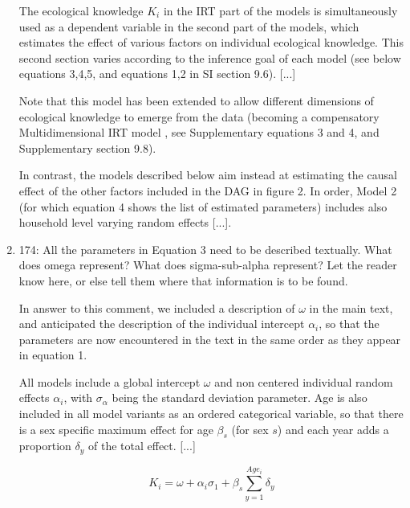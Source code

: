 \documentclass{article}
\newcommand{\rev}[1]{{\color{Red}#1}}
\newcommand{\comment}[1]{{\color{Blue}#1}}
\begin{document}
\begin{enumerate}
    \rev{The ecological knowledge $K_i$ in the IRT part of the models is simultaneously used as a dependent variable in the second part of the models, which estimates the effect of various factors on individual \rev{ecological} knowledge. This second section varies according to the inference goal of each model (see below equations 3,4,5, and equations 1,2 in SI section 9.6). [...]}

    \rev{Note that this model has been extended to allow different dimensions of ecological knowledge to emerge from the data (becoming a compensatory Multidimensional IRT model \citep{Reckase2009MultidimensionalTheory}, see Supplementary equations 3 and 4, and Supplementary section 9.8).}

    \rev{In contrast, the models described below aim instead at estimating the causal effect of the other factors included in the DAG in figure 2. In order, Model 2 (\rev{for which equation 4 shows the list of estimated parameters}) includes also household level varying random effects [...].}


    \item 174: All the parameters in Equation 3 need to be described textually. What does omega represent? What does sigma-sub-alpha represent? Let the reader know here, or else tell them where that information is to be found.
    
    \comment{In answer to this comment, we included a description of $\omega$ in the main text, and anticipated the description of the individual intercept $\alpha_i$, so that the parameters are now encountered in the text in the same order as they appear in equation 1.}
    
    \rev{All models include a global intercept $\omega$ and non centered individual random effects $\alpha_i$, with $\sigma_{\alpha}$  being the standard deviation parameter. Age is also included in all \rev{model variants}  as an ordered categorical variable, so that there is a sex specific maximum effect for age $\beta_s$ (for sex $s$) and each year adds a proportion $\delta_y$ of the total effect. [...]}

\rev{ $$K_i = \omega + \alpha_i \sigma_1 + \beta_s \sum_{y=1}^{Age_i}  \delta_y $$}


\end{enumerate}
\end{document}
